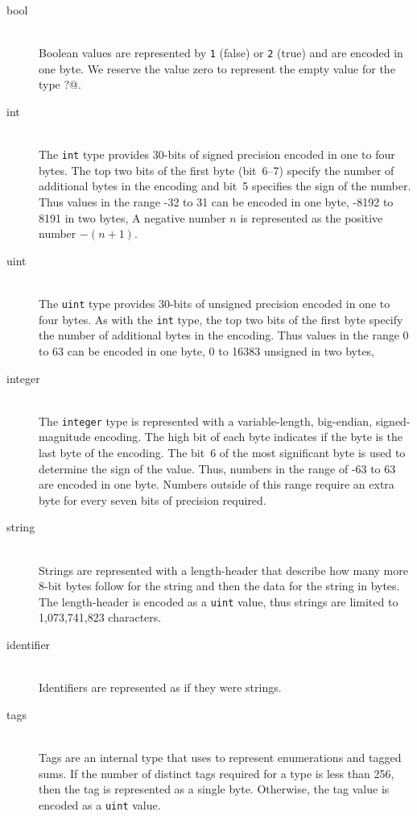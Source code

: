 \begin{description}
  \item[bool] \mbox{}\\
    Boolean values are represented by \lstinline!1! (false) or \lstinline!2! (true)
    and are encoded in one byte.  We reserve the value zero to represent the
    empty value for the type \lstinline@bool?@.

  \item[int] \mbox{}\\
    The \lstinline!int! type provides 30-bits of signed precision encoded in one to
    four bytes.
    The top two bits of the first byte (bit~6--7) specify the number of additional
    bytes in the encoding and bit~5 specifies the sign of the number.
    Thus values in the range -32 to 31 can be encoded in one byte,
    -8192 to 8191 in two bytes, \etc{}
    A negative number $n$ is represented as the positive number $-(n+1)$.

  \item[uint] \mbox{}\\
    The \lstinline!uint! type provides 30-bits of unsigned precision encoded in one
    to four bytes.
    As with the \lstinline!int! type, the top two bits of the first byte specify the
    number of additional bytes in the encoding.
    Thus values in the range 0 to 63 can be encoded in one byte,
    0 to 16383 unsigned in two bytes, \etc{}

  \item[integer] \mbox{}\\
    The \asdl{} \lstinline!integer! type is represented with a variable-length,
    big-endian, signed-magnitude encoding.
    The high bit of each byte indicates if the byte is the last byte of
    the encoding.
    The bit~6 of the most significant byte is used to determine the
    sign of the value.
    Thus, numbers in the range of -63 to 63 are encoded in one byte.
    Numbers outside of this range require an extra byte for every seven bits
    of precision required.

  \item[string] \mbox{}\\
    Strings are represented with a length-header that describe how many more
    8-bit bytes follow for the string and then the data for the string in bytes.
    The length-header is encoded as a \lstinline!uint! value, thus strings are limited
    to 1,073,741,823 characters.

  \item[identifier] \mbox{}\\
    Identifiers are represented as if they were strings.

  \item[tags] \mbox{}\\
    Tags are an internal type that \asdl{} uses to represent enumerations and
    tagged sums.
    If the number of distinct tags required for a type is less than 256, then
    the tag is represented as a single byte.
    Otherwise, the tag value is encoded as a \lstinline!uint! value.
\end{description}%

